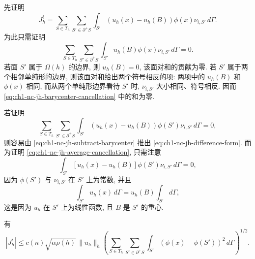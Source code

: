 \begin{Proof}
先证明
\begin{equation}
J_h^i=\sum_{S\in T_h}\sum_{S'\in\partial^+S}
\int_{S'}(u_h(x)-u_h(B))\phi(x)\nu_{i,S'}\,d\Gamma.
\label{eq:ch1-nc-jh-subtract-barycenter}
\end{equation}
为此只需证明
\begin{equation}
\sum_{S\in T_h}\sum_{S'\in\partial^+S}
\int_{S'}u_h(B)\phi(x)\nu_{i,S'}\,d\Gamma=0.
\label{eq:ch1-nc-jh-barycenter-cancellation}
\end{equation}
若面 $S'$ 属于 $\Omega(h)$ 的边界, 则 $u_h(B)=0$, 该面对和的贡献为零. 若 $S'$ 属于两个相邻单纯形的边界, 则该面对和给出两个符号相反的项: 两项中的 $u_h(B)$ 和 $\phi(x)$ 相同, 而从两个单纯形边界看待 $S'$ 时, $\nu_{i,S'}$ 大小相同、符号相反. 因而 \eqref{eq:ch1-nc-jh-barycenter-cancellation} 中的和为零.

若证明
\begin{equation}
\sum_{S\in T_h}\sum_{S'\in\partial^+S}
\int_{S'}(u_h(x)-u_h(B))\phi(S')\nu_{i,S'}\,d\Gamma=0,
\label{eq:ch1-nc-jh-average-cancellation}
\end{equation}
则容易由 \eqref{eq:ch1-nc-jh-subtract-barycenter} 推出 \eqref{eq:ch1-nc-jh-difference-form}. 而为证明 \eqref{eq:ch1-nc-jh-average-cancellation}, 只需注意
\[
\int_{S'}[u_h(x)-u_h(B)]\phi(S')\nu_{i,S'}\,d\Gamma=0,
\]
因为 $\phi(S')$ 与 $\nu_{i,S'}$ 在 $S'$ 上为常数, 并且
\begin{equation}
\int_{S'}u_h(x)\,d\Gamma
=u_h(B)\int_{S'}d\Gamma,
\label{eq:ch1-nc-linear-face-average}
\end{equation}
这是因为 $u_h$ 在 $S'$ 上为线性函数, 且 $B$ 是 $S'$ 的重心.
\end{Proof}

\begin{Lemma}
\label{lem:ch1-nc-boundary-cauchy}
有
\begin{equation}
|J_h^i|\leq c(n)\sqrt{\alpha\rho(h)}\,\|u_h\|_h
\left(\sum_{S\in T_h}\sum_{S'\in\partial^+S}
\int_{S'}(\phi(x)-\phi(S'))^2\,d\Gamma\right)^{1/2}.
\label{eq:ch1-nc-jh-cauchy-bound}
\end{equation}
\end{Lemma}


